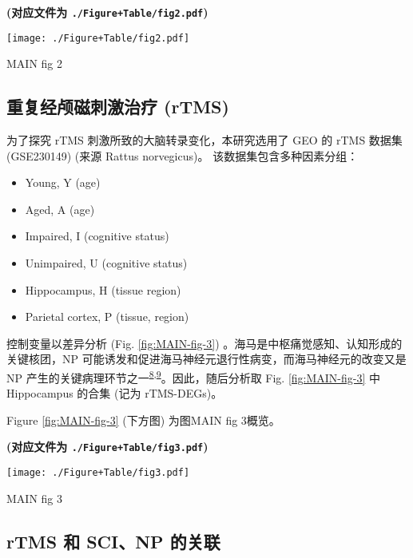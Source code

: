 \documentclass[
]{article}
\providecommand{\tightlist}{%
  \setlength{\itemsep}{0pt}\setlength{\parskip}{0pt}}
\begin{document}
\textbf{(对应文件为 \texttt{./Figure+Table/fig2.pdf})}

\def\@captype{figure}
\begin{center}
\texttt{[image: ./Figure+Table/fig2.pdf]}
\caption{MAIN fig 2}\label{fig:MAIN-fig-2}
\end{center}

\hypertarget{res-rtms}{%
\subsection{重复经颅磁刺激治疗 (rTMS)}\label{res-rtms}}

为了探究 rTMS 刺激所致的大脑转录变化，本研究选用了 GEO 的 rTMS 数据集 (GSE230149) (来源 Rattus norvegicus)。
该数据集包含多种因素分组：

\begin{itemize}
\tightlist
\item
  Young, Y (age)
\item
  Aged, A (age)
\item
  Impaired, I (cognitive status)
\item
  Unimpaired, U (cognitive status)
\item
  Hippocampus, H (tissue region)
\item
  Parietal cortex, P (tissue, region)
\end{itemize}

控制变量以差异分析 (Fig. \ref{fig:MAIN-fig-3}) 。海马是中枢痛觉感知、认知形成的关键核团，NP 可能诱发和促进海马神经元退行性病变，而海马神经元的改变又是 NP 产生的关键病理环节之一\textsuperscript{\protect\hyperlink{ref-EffectOfBrainMagari2011}{8},\protect\hyperlink{ref-CombinationPhaChapar2012}{9}}。因此，随后分析取 Fig. \ref{fig:MAIN-fig-3} 中 Hippocampus 的合集 (记为 rTMS-DEGs)。

Figure \ref{fig:MAIN-fig-3} (下方图) 为图MAIN fig 3概览。

\textbf{(对应文件为 \texttt{./Figure+Table/fig3.pdf})}

\def\@captype{figure}
\begin{center}
\texttt{[image: ./Figure+Table/fig3.pdf]}
\caption{MAIN fig 3}\label{fig:MAIN-fig-3}
\end{center}

\hypertarget{rtms-ux548c-scinp-ux7684ux5173ux8054}{%
\subsection{rTMS 和 SCI、NP 的关联}\label{rtms-ux548c-scinp-ux7684ux5173ux8054}}
\end{document}
